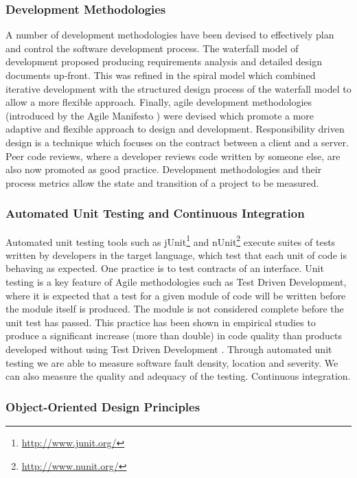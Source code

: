 \subsubsection{Development Methodologies}
A number of development methodologies have been devised to effectively plan and control the software development process. The waterfall model of development proposed producing requirements analysis and detailed design documents up-front. This was refined in the spiral model which combined iterative development with the structured design process of the waterfall model to allow a more flexible approach. Finally, agile development methodologies (introduced by the Agile Manifesto \citep{beck01}) were devised which promote a more adaptive and flexible approach to design and development. Responsibility driven design is a technique which focuses on the contract between a client and a server. Peer code reviews, where a developer reviews code written by someone else, are also now promoted as good practice.  Development methodologies and their process metrics allow the state and transition of a project to be measured.  


\subsubsection{Automated Unit Testing and Continuous Integration}

Automated unit testing tools such as jUnit\footnote{\url{http://www.junit.org/}} and nUnit\footnote{\url{http://www.nunit.org/}} execute suites of tests written by developers in the target language, which test that each unit of code is behaving as expected. One practice is to test contracts of an interface. Unit testing is a key feature of Agile methodologies such as Test Driven Development, where it is expected that a test for a given module of code will be written before the module itself is produced. The module is not considered complete before the unit test has passed. This practice has been shown in empirical studies to produce a significant increase (more than double) in code quality than products developed without using Test Driven Development \citep{bhat06}. Through automated unit testing we are able to measure software fault density, location and severity. We can also measure the quality and adequacy of the testing. Continuous integration.

\subsubsection{Object-Oriented Design Principles}

